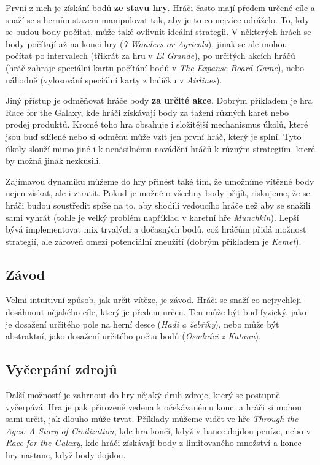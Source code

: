 První z nich je získání bodů \textbf{ze stavu hry}. Hráči často mají předem určené cíle a snaží se s herním stavem manipulovat tak, aby je to co nejvíce odráželo. To, kdy se budou body počítat, může také ovlivnit ideální strategii. V některých hrách se body počítají až na konci hry (\textit{7 Wonders or Agricola}), jinak se ale mohou počítat po intervalech (třikrát za hru v \textit{El Grande}), po určitých akcích hráčů (hráč zahraje speciální kartu počítání bodů v \textit{The Expanse Board Game}), nebo náhodně (vylosování speciální karty z balíčku v \textit{Airlines}).

Jiný přístup je odměňovat hráče body \textbf{za určité akce}. Dobrým příkladem je hra Race for the Galaxy, kde hráči získávají body za tažení různých karet nebo prodej produktů. Kromě toho hra obsahuje i složitější mechanismus úkolů, které jsou buď sdílené nebo si odměnu může vzít jen první hráč, který je splní. Tyto úkoly slouží mimo jiné i k nenásilnému navádění hráčů k různým strategiím, které by možná jinak nezkusili.

Zajímavou dynamiku můžeme do hry přinést také tím, že umožníme vítězné body nejen získat, ale i ztratit. Pokud je možné o všechny body přijít, riskujeme, že se hráči budou soustředit spíše na to, aby shodili vedoucího hráče než aby se snažili sami vyhrát (tohle je velký problém například v karetní hře \textit{Munchkin}). Lepší bývá implementovat mix trvalých a dočasných bodů, což hráčům přidá možnost strategií, ale zároveň omezí potenciální zneužití (dobrým příkladem je \textit{Kemet}).

\subsection{Závod}
\label{subsec:end_race}

Velmi intuitivní způsob, jak určit vítěze, je závod. Hráči se snaží co nejrychleji dosáhnout nějakého cíle, který je předem určen. Ten může být buď fyzický, jako je dosažení určitého pole na herní desce (\textit{Hadi a žebříky}), nebo může být abstraktní, jako dosažení určitého počtu bodů (\textit{Osadníci z Katanu}).

\subsection{Vyčerpání zdrojů}
\label{subsec:end_resource_depletion}

Další možností je zahrnout do hry nějaký druh zdroje, který se postupně vyčerpává. Hra je pak přirozeně vedena k očekávanému konci a hráči si mohou sami určit, jak dlouho může trvat. Příklady můžeme vidět ve hře \textit{Through the Ages: A Story of Civilization}, kde hra končí, když v bance dojdou peníze, nebo v \textit{Race for the Galaxy}, kde hráči získávají body z limitovaného množství a konec hry nastane, když body dojdou.

